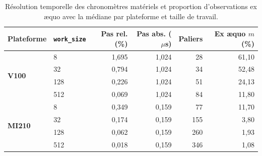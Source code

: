 \begin{table}[htb]
    \centering
    \small
    \caption{Résolution temporelle des chronomètres matériels et proportion d'observations ex æquo avec la médiane par plateforme et taille de travail.}
    \label{tab:seuils-quantification}
    \renewcommand{\arraystretch}{1.25}
    \begin{tabular}{llrrrr}
        \toprule
        \textbf{Plateforme} & \textbf{\texttt{work\_size}} & \textbf{Pas rel. (\%)} & \textbf{Pas abs. ($\mu$s)} & \textbf{Paliers} & \textbf{Ex æquo $m$ (\%)} \\
        \midrule
        \multirow{4}{*}{\textbf{V100}}  & 8   & 1{,}695 & 1{,}024 & 28  & 61{,}10 \\
        & 32  & 0{,}794 & 1{,}024 & 34  & 52{,}48 \\
        & 128 & 0{,}226 & 1{,}024 & 51  & 24{,}13 \\
        & 512 & 0{,}069 & 1{,}024 & 84  & 11{,}80 \\
        \midrule
        \multirow{4}{*}{\textbf{MI210}} & 8   & 0{,}349 & 0{,}159 & 77  & 11{,}70 \\
        & 32  & 0{,}174 & 0{,}159 & 155 & 3{,}80  \\
        & 128 & 0{,}062 & 0{,}159 & 260 & 1{,}93  \\
        & 512 & 0{,}018 & 0{,}159 & 346 & 1{,}08  \\
        \bottomrule
    \end{tabular}
\end{table}
